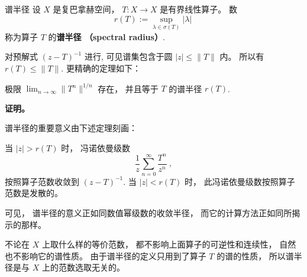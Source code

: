 
\begin{definition}{谱半径}
设 $X$ 是复巴拿赫空间， $T:X\to X$ 是有界线性算子。 数
$$
r(T):=\sup_{\lambda\in\sigma(T)}|\lambda|~
$$
称为算子 $T$ 的\textbf{谱半径 （spectral radius）}.
\end{definition}

对预解式 $(z-T)^{-1}$ 进行, 可见谱集包含于圆 $|z|\leq\|T\|$ 内。 所以有 $r(T)\leq\|T\|$. 更精确的定理如下：
\begin{theorem}{}
极限 $\lim_{n\to\infty}\|T^n\|^{1/n}$ 存在， 并且等于 $T$ 的谱半径 $r(T)$. 
\end{theorem}
\textbf{证明。} 

谱半径的重要意义由下述定理刻画：
\begin{theorem}{}
当 $|z|>r(T)$ 时， 冯诺依曼级数
$$
\frac{1}{z}\sum_{n=0}^\infty\frac{T^n}{z^n}~,
$$ 
按照算子范数收敛到 $(z-T)^{-1}$. 当 $|z|<r(T)$ 时， 此冯诺依曼级数按照算子范数是发散的。
\end{theorem}

可见， 谱半径的意义正如同数值幂级数的收敛半径， 而它的计算方法正如同所揭示的那样。

不论在 $X$ 上取什么样的等价范数， 都不影响上面算子的可逆性和连续性， 自然也不影响它的谱性质。 由于谱半径的定义只用到了算子 $T$ 的谱的性质， 所以谱半径是与 $X$ 上的范数选取无关的。 
